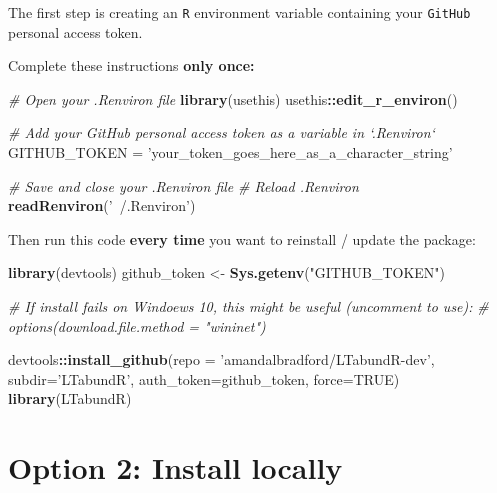 \documentclass[
]{book}
\newenvironment{Shaded}{\begin{snugshade}}{\end{snugshade}}
\newcommand{\CommentTok}[1]{\textcolor[rgb]{0.56,0.35,0.01}{\textit{#1}}}
\newcommand{\DataTypeTok}[1]{\textcolor[rgb]{0.13,0.29,0.53}{#1}}
\newcommand{\KeywordTok}[1]{\textcolor[rgb]{0.13,0.29,0.53}{\textbf{#1}}}
\newcommand{\NormalTok}[1]{#1}
\newcommand{\OperatorTok}[1]{\textcolor[rgb]{0.81,0.36,0.00}{\textbf{#1}}}
\newcommand{\OtherTok}[1]{\textcolor[rgb]{0.56,0.35,0.01}{#1}}
\newcommand{\StringTok}[1]{\textcolor[rgb]{0.31,0.60,0.02}{#1}}
\begin{document}
The first step is creating an \texttt{R} environment variable containing your \texttt{GitHub} personal access token.

Complete these instructions \textbf{only once:}

\begin{Shaded}
\begin{Highlighting}[]
\CommentTok{# Open your .Renviron file}
\KeywordTok{library}\NormalTok{(usethis)}
\NormalTok{usethis}\OperatorTok{::}\KeywordTok{edit_r_environ}\NormalTok{()}

\CommentTok{# Add your GitHub personal access token as a variable in `.Renviron`}
\NormalTok{GITHUB_TOKEN =}\StringTok{ 'your_token_goes_here_as_a_character_string'}

\CommentTok{# Save and close your .Renviron file}
\CommentTok{# Reload .Renviron}
\KeywordTok{readRenviron}\NormalTok{(}\StringTok{'~/.Renviron'}\NormalTok{)}
\end{Highlighting}
\end{Shaded}

Then run this code \textbf{every time} you want to reinstall / update the package:

\begin{Shaded}
\begin{Highlighting}[]
\KeywordTok{library}\NormalTok{(devtools)}
\NormalTok{github_token <-}\StringTok{ }\KeywordTok{Sys.getenv}\NormalTok{(}\StringTok{"GITHUB_TOKEN"}\NormalTok{)}

\CommentTok{# If install fails on Windoews 10, this might be useful (uncomment to use):}
\CommentTok{# options(download.file.method = "wininet")}

\NormalTok{devtools}\OperatorTok{::}\KeywordTok{install_github}\NormalTok{(}\DataTypeTok{repo =} \StringTok{'amandalbradford/LTabundR-dev'}\NormalTok{,}
                         \DataTypeTok{subdir=}\StringTok{'LTabundR'}\NormalTok{,}
                         \DataTypeTok{auth_token=}\NormalTok{github_token,}
                         \DataTypeTok{force=}\OtherTok{TRUE}\NormalTok{)}
\KeywordTok{library}\NormalTok{(LTabundR)}
\end{Highlighting}
\end{Shaded}

\hypertarget{option-2-install-locally}{%
\section*{Option 2: Install locally}\label{option-2-install-locally}}
\end{document}

